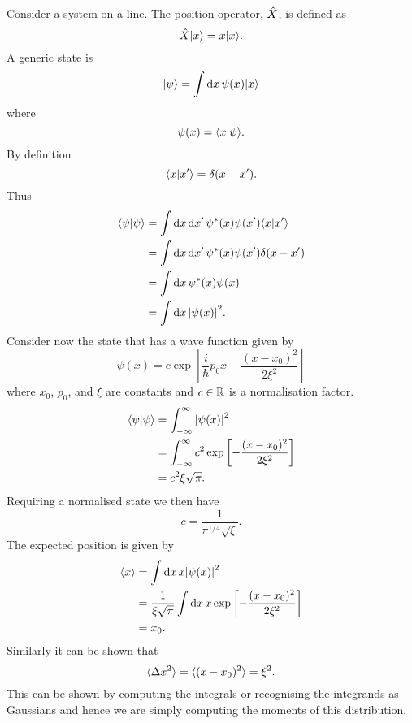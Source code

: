     \begin{example}
        Consider a system on a line.
        The position operator, \(\hat{X}\), is defined as
        \[\hat{X}\vert {x} \rangle = x\vert {x} \rangle.\]
        A generic state is
        \[\vert {\psi} \rangle = \int\dd{x}\psi(x)\vert {x} \rangle\]
        where
        \[\psi(x) = \langle {x} \vert {\psi} \rangle.\]
        By definition
        \[\langle {x} \vert {x'} \rangle = \delta(x - x').\]
        Thus
        \begin{align*}
            \langle {\psi} \vert {\psi} \rangle &= \int\dd{x}\dd{x'}\psi^*(x)\psi(x')\langle {x} \vert {x'} \rangle\\
            &= \int\dd{x}\dd{x'}\psi^*(x)\psi(x')\delta(x - x')\\
            &= \int\dd{x}\psi^*(x)\psi(x)\\
            &= \int\dd{x}\abs{\psi(x)}^2.
        \end{align*}
        Consider now the state that has a wave function given by
        \[\psi(x) = c\exp\left[\frac{i}{\hbar}p_0x - \frac{(x - x_0)^2}{2\xi^2}\right]\]
        where \(x_0\), \(p_0\), and \(\xi\) are constants and \(c\in\mathbb{R}\) is a normalisation factor.
        \begin{align*}
            \langle {\psi} \vert {\psi} \rangle &= \int_{-\infty}^{\infty} \abs{\psi(x)}^2\\
            &= \int_{-\infty}^{\infty} c^2\exp\left[-\frac{(x - x_0)^2}{2\xi^2}\right]\\
            &= c^2\xi\sqrt{\pi}.
        \end{align*}
        Requiring a normalised state we then have
        \[c = \frac{1}{\pi^{1/4}\sqrt{\xi}}.\]
        The expected position is given by
        \begin{align*}
            \langle{x}\rangle &= \int\dd{x} x\abs{\psi(x)}^2\\
            &= \frac{1}{\xi\sqrt{\pi}}\int\dd{x} x\exp\left[-\frac{(x - x_0)^2}{2\xi^2}\right]\\
            &= x_0.
        \end{align*}
        Similarly it can be shown that
        \[\langle{\Delta x^2}\rangle = \langle{(x - x_0)^2}\rangle = \xi^2.\]
        This can be shown by computing the integrals or recognising the integrands as Gaussians and hence we are simply computing the moments of this distribution.
    \end{example}
